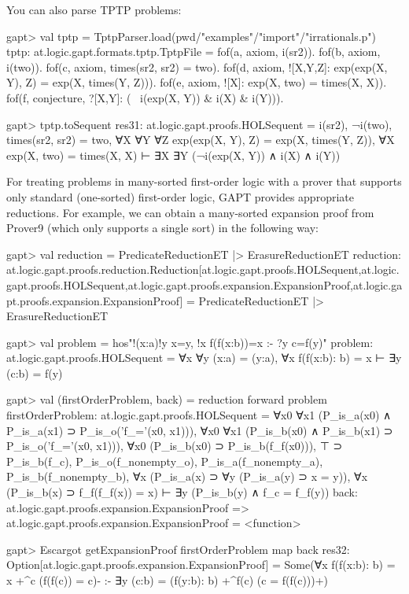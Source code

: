 \documentclass[a4paper,11pt]{book}
\begin{document}
You can also parse TPTP problems:
\begin{clilisting}
gapt> val tptp = TptpParser.load(pwd/"examples"/"import"/"irrationals.p")
tptp: at.logic.gapt.formats.tptp.TptpFile =
fof(a, axiom, i(sr2)).
fof(b, axiom, ~ i(two)).
fof(c, axiom, times(sr2, sr2) = two).
fof(d, axiom, ![X,Y,Z]: exp(exp(X, Y), Z) = exp(X, times(Y, Z))).
fof(e, axiom, ![X]: exp(X, two) = times(X, X)).
fof(f, conjecture, ?[X,Y]: (~ i(exp(X, Y)) & i(X) & i(Y))).

gapt> tptp.toSequent
res31: at.logic.gapt.proofs.HOLSequent =
i(sr2),
¬i(two),
times(sr2, sr2) = two,
∀X ∀Y ∀Z exp(exp(X, Y), Z) = exp(X, times(Y, Z)),
∀X exp(X, two) = times(X, X)
⊢
∃X ∃Y (¬i(exp(X, Y)) ∧ i(X) ∧ i(Y))

\end{clilisting}

For treating problems in many-sorted first-order logic with a prover that supports only
standard (one-sorted) first-order logic, GAPT provides appropriate reductions.
For example, we can obtain a many-sorted expansion proof from Prover9
(which only supports a single sort) in the following way:
\begin{clilisting}
gapt> val reduction = PredicateReductionET |> ErasureReductionET
reduction: at.logic.gapt.proofs.reduction.Reduction[at.logic.gapt.proofs.HOLSequent,at.logic.gapt.proofs.HOLSequent,at.logic.gapt.proofs.expansion.ExpansionProof,at.logic.gapt.proofs.expansion.ExpansionProof] = PredicateReductionET |> ErasureReductionET

gapt> val problem = hos"!(x:a)!y x=y, !x f(f(x:b))=x :- ?y c=f(y)"
problem: at.logic.gapt.proofs.HOLSequent = ∀x ∀y (x:a) = (y:a), ∀x f(f(x:b): b) = x ⊢ ∃y (c:b) = f(y)

gapt> val (firstOrderProblem, back) = reduction forward problem
firstOrderProblem: at.logic.gapt.proofs.HOLSequent =
∀x0 ∀x1 (P_is_a(x0) ∧ P_is_a(x1) ⊃ P_is_o('f_='(x0, x1))),
∀x0 ∀x1 (P_is_b(x0) ∧ P_is_b(x1) ⊃ P_is_o('f_='(x0, x1))),
∀x0 (P_is_b(x0) ⊃ P_is_b(f_f(x0))),
⊤ ⊃ P_is_b(f_c),
P_is_o(f_nonempty_o),
P_is_a(f_nonempty_a),
P_is_b(f_nonempty_b),
∀x (P_is_a(x) ⊃ ∀y (P_is_a(y) ⊃ x = y)),
∀x (P_is_b(x) ⊃ f_f(f_f(x)) = x)
⊢
∃y (P_is_b(y) ∧ f_c = f_f(y))
back: at.logic.gapt.proofs.expansion.ExpansionProof => at.logic.gapt.proofs.expansion.ExpansionProof = <function>

gapt> Escargot getExpansionProof firstOrderProblem map back
res32: Option[at.logic.gapt.proofs.expansion.ExpansionProof] =
Some(∀x f(f(x:b): b) = x +^{c} (f(f(c)) = c)-
:-
∃y (c:b) = (f(y:b): b) +^{f(c)} (c = f(f(c)))+)

\end{clilisting}
\end{document}
